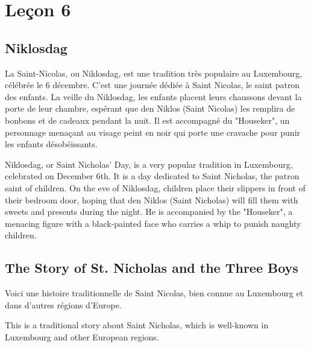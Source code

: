 \chapter{Leçon 6}

\section{Niklosdag}
La Saint-Nicolas, ou Niklosdag, est une tradition très populaire au Luxembourg, célébrée le 6 décembre. C'est une journée dédiée à Saint Nicolas, le saint patron des enfants. La veille du Niklosdag, les enfants placent leurs chaussons devant la porte de leur chambre, espérant que den Niklos (Saint Nicolas) les remplira de bonbons et de cadeaux pendant la nuit. Il est accompagné du "Houseker", un personnage menaçant au visage peint en noir qui porte une cravache pour punir les enfants désobéissants.

Niklosdag, or Saint Nicholas' Day, is a very popular tradition in Luxembourg, celebrated on December 6th. It is a day dedicated to Saint Nicholas, the patron saint of children. On the eve of Niklosdag, children place their slippers in front of their bedroom door, hoping that den Niklos (Saint Nicholas) will fill them with sweets and presents during the night. He is accompanied by the "Houseker", a menacing figure with a black-painted face who carries a whip to punish naughty children.

\section{The Story of St. Nicholas and the Three Boys}
Voici une histoire traditionnelle de Saint Nicolas, bien connue au Luxembourg et dans d'autres régions d'Europe. 

This is a traditional story about Saint Nicholas, which is well-known in Luxembourg and other European regions.

